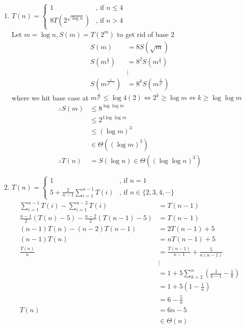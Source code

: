 \documentclass[12pt, a4paper]{article}
\begin{document}
\begin{enumerate}[B\arabic*).]
  \item $\displaystyle T(n) = \begin{cases}1 & \text{, if $n \leq 4$}\\ 8T(2^{\sqrt{\log n}}) & \text{, if $n > 4$}\end{cases}$\\
    Let $m = \log n, S(m) = T(2^m)$ to get rid of base $2$
    \begin{align*}
      S(m) &= 8S(\sqrt m)\\
      S(m^{\frac{1}{2}}) &= 8^2 S(m^{\frac{1}{4}})\\
                         &\vdots\\
      S(m^{\frac{1}{2^{k-1}}}) &= 8^k S(m^{\frac{1}{2^k}})
    \end{align*}
    where we hit base case at $m^{\frac{1}{2^k}} \leq \log 4 (2) \iff 2^k \geq \log m \iff k \geq \log\log m$
    \begin{align*}
      \therefore S(m) &\leq 8^{\log\log m}\\
                      &\leq 2^{3\log\log m}\\
                      &\leq (\log m)^3\\
                      &\in \Theta((\log m)^3)\\
      \therefore T(n) &= S(\log n) \in \Theta((\log\log n)^3)
    \end{align*}

  \item $\displaystyle T(n) = \begin{cases}1 & \text{, if $n = 1$}\\ 5 + \frac{2}{n-1}\sum^{n-1}_{i=1}T(i) & \text{, if $n \in \{2, 3, 4, \cdots\}$}\end{cases}$\\
    \begin{align*}
      \sum^{n-1}_{i=1}T(i) - \sum^{n-2}_{i=1}T(i) &= T(n-1)\\
      \frac{n-1}{2}(T(n)-5) - \frac{n-2}{2}(T(n-1)-5)&= T(n-1)\\
      (n-1)T(n) - (n-2)T(n-1) &= 2T(n-1) + 5\\
      (n-1)T(n)&= nT(n-1)+5\\
      \frac{T(n)}{n} &= \frac{T(n-1)}{n-1} + \frac{5}{n(n-1)}\\
                     &\vdots\\
                     &= 1 + 5 \sum^n_{k=2}(\frac{1}{k-1} - \frac{1}{k})\\
                     &= 1 + 5(1- \frac{1}{n})\\
                     &= 6 - \frac{5}{n}\\
      T(n) &= 6n-5\\
           &\in \Theta(n)
    \end{align*}

\end{enumerate}
\end{document}
